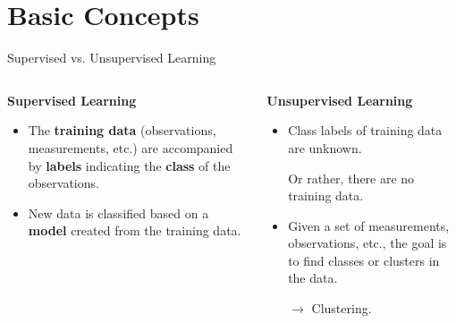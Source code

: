 \section{Basic Concepts}

\begin{frame}{Supervised vs. Unsupervised Learning}
	\begin{columns}
		\begin{column}{0.45\textwidth}
			\textbf{Supervised Learning}
			\begin{itemize}
				\item The \textbf{training data} (observations, measurements, etc.) are accompanied by \textbf{labels} indicating the \textbf{class} of the observations.
				\item New data is classified based on a \textbf{model} created from the training data.
			\end{itemize}

		\end{column}

		\begin{column}{0.45\textwidth}
			\textbf{Unsupervised Learning}

			\begin{itemize}
				\item Class labels of training data are unknown.

				      Or rather, there are no training data.
			\end{itemize}
			\begin{itemize}
				\item Given a set of measurements, observations, etc., the goal is to find classes or clusters in the data.

				      $\rightarrow$ Clustering.
			\end{itemize}

		\end{column}
	\end{columns}
\end{frame}

